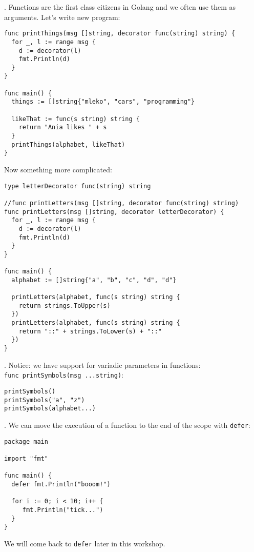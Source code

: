 \documentclass[11pt, letterpaper]{article}
\begin{document}
. Functions are the first class citizens in Golang and we often use them as arguments. Let's write new program:

\begin{verbatim}
func printThings(msg []string, decorator func(string) string) {
  for _, l := range msg {
    d := decorator(l)
    fmt.Println(d)
  }
}

func main() {
  things := []string{"mleko", "cars", "programming"}

  likeThat := func(s string) string {
    return "Ania likes " + s
  }
  printThings(alphabet, likeThat)
}
\end{verbatim}

Now something more complicated:

\begin{verbatim}
type letterDecorator func(string) string

//func printLetters(msg []string, decorator func(string) string)
func printLetters(msg []string, decorator letterDecorator) {
  for _, l := range msg {
    d := decorator(l)
    fmt.Println(d)
  }
}

func main() {
  alphabet := []string{"a", "b", "c", "d", "d"}

  printLetters(alphabet, func(s string) string {
    return strings.ToUpper(s)
  })
  printLetters(alphabet, func(s string) string {
    return "::" + strings.ToLower(s) + "::"
  })
}
\end{verbatim}

. Notice: we have support for variadic parameters in functions:\\ \texttt{func printSymbols(msg ...string)}:

\begin{verbatim}
printSymbols()
printSymbols("a", "z")
printSymbols(alphabet...)
\end{verbatim}

. We can move the execution of a function to the end of the scope with \verb|defer|:

\begin{verbatim}
package main

import "fmt"

func main() {
  defer fmt.Println("booom!")

  for i := 0; i < 10; i++ {
     fmt.Println("tick...")
  }
}
\end{verbatim}

We will come back to \texttt{defer} later in this workshop.
\end{document}
